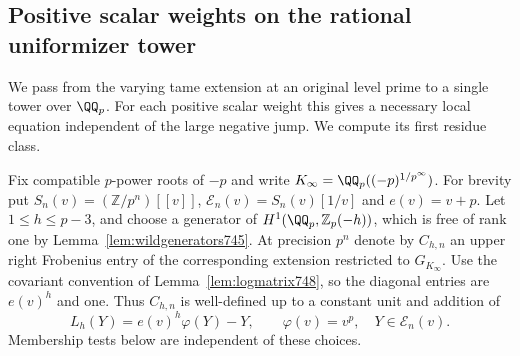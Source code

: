 \documentclass[a4paper,11pt]{article}
\theoremstyle{definition}
\theoremstyle{remark}
\numberwithin{equation}{section}
\begin{document}
\subsection{Positive scalar weights on the rational uniformizer tower}
\label{sec:rationaltower749}
We pass from the varying tame extension at an original level
prime to a single tower over \(\QQ_p\). For each positive scalar
weight this gives a necessary local equation independent of the
large negative jump. We compute its first residue class.

Fix compatible \(p\)-power roots of \(-p\) and write
\(K_\infty=\QQ_p((-p)^{1/p^\infty})\). For brevity put
\(S_n(v)=(\mathbb Z/p^n)[[v]]\), \(\mathcal E_n(v)=S_n(v)[1/v]\)
and \(e(v)=v+p\). Let \(1\le h\le p-3\), and choose a generator
of \(H^1(\QQ_p,\mathbb Z_p(-h))\), which is free of rank one
by Lemma~\ref{lem:wildgenerators745}. At precision \(p^n\)
denote by \(C_{h,n}\) an upper right Frobenius entry of the
corresponding extension restricted to \(G_{K_\infty}\).
Use the covariant convention of Lemma~\ref{lem:logmatrix748},
so the diagonal entries are \(e(v)^h\) and one. Thus \(C_{h,n}\)
is well-defined up to a constant unit and addition of
\[
           L_h(Y)=e(v)^h\varphi(Y)-Y,\qquad
           \varphi(v)=v^p,\quad Y\in\mathcal E_n(v).
\]
Membership tests below are independent of these choices.
\end{document}
